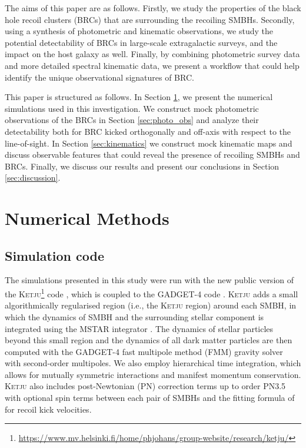 \documentclass[twocolumn]{aastex631}
\newcommand{\ketju}{\textsc{Ketju}}                           %
\begin{document}
The aims of this paper are as follows. Firstly, we study the properties of the black hole recoil clusters (BRCs) that are surrounding the recoiling SMBHs. Secondly, using a synthesis of photometric and kinematic observations, we study the potential detectability of BRCs in large-scale extragalactic surveys, and the impact on the host galaxy as well.
Finally, by combining photometric survey data and more detailed spectral kinematic data, we present a workflow that could help identify the unique observational signatures of BRC. 

This paper is structured as follows. In Section \ref{sec:methods}, we present the numerical simulations used in this investigation. 
We construct mock photometric observations of the BRCs in Section \ref{sec:photo_obs} and analyze their detectability both for BRC kicked orthogonally and off-axis with respect to the line-of-sight. In Section \ref{sec:kinematics} we construct mock kinematic maps and discuss observable features that could reveal the presence of recoiling SMBHs and BRCs. Finally, we discuss our results and present our conclusions in Section \ref{sec:discussion}.  



\section{Numerical Methods} \label{sec:methods}
\subsection{Simulation code}\label{ssec:sim_code}
The simulations presented in this study were run with the new public version of the \ketju{}\footnote{\url{https://www.mv.helsinki.fi/home/phjohans/group-website/research/ketju/}} code \citep{rantala2017,rantala2020,mannerkoski2023}, which is coupled to the GADGET-4 code \citep{springel2021}. 
\ketju{} adds a small algorithmically regularised region (i.e., the \ketju{} region) around each SMBH, in which the dynamics of SMBH and the surrounding stellar component is integrated using the MSTAR integrator \citep{rantala2020}. The dynamics of stellar particles beyond this small region and the dynamics of all dark matter particles are then computed with the GADGET-4 fast multipole method (FMM) gravity solver with second-order multipoles. We also employ hierarchical time integration, which allows for mutually symmetric interactions and manifest momentum conservation. \ketju{} also includes post-Newtonian (PN) correction terms up to order PN3.5 with optional spin terms between each pair of SMBHs \citep{blanchet2014} and the fitting formula of \citet{zlochower2015} for recoil kick velocities.     
\end{document}
